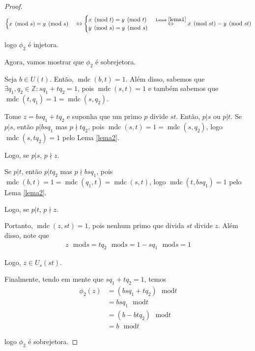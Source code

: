 \documentclass[a4paper,portuguese,11pt,twoside, leqno]{book}
\DeclareMathOperator{\mdc}{mdc}
\theoremstyle{definition}
\begin{document}
\begin{proof}
\begin{align*}
\begin{cases}
		x\pmod s = y\pmod s
		\end{cases}\Leftrightarrow
		\begin{cases}
		x\pmod t = y\pmod t \\
		y\pmod s = y\pmod s
		\end{cases} \overset{\text{Lema } \eqref{lema1}}{\Leftrightarrow } x\pmod {st} = y\pmod{st} 
		\end{align*}
		\par\vspace{0.3cm}logo $\phi_2$ é injetora. 
		\par\vspace{0.3cm} Agora, vamos mostrar que $\phi_2$ é sobrejetora.
		\par\vspace{0.3cm} Seja $b\in U(t)$. Então, $\mdc(b,t) = 1$. Além disso, sabemos que $\exists q_1, q_2\in\mathbb{Z}: sq_1 + tq_2 = 1$, pois $\mdc(s,t) = 1$ e também sabemos que $\mdc(t,q_1) = 1 = \mdc(s, q_2)$. 
		\par\vspace{0.3cm} Tome $z = bsq_1 + tq_2$ e suponha que um primo $p$ divide $st$. Então, $p|s$ ou $p|t$. Se $p|s$, então $p|bsq_1$ mas $p\nmid tq_2$, pois $\mdc(s,t) = 1 = \mdc(s,q_2)$, logo $\mdc(s, tq_2) = 1$ pelo Lema \eqref{lema2}. 
		\par\vspace{0.3cm} Logo, se $p|s$, $p\nmid z$.
		\par\vspace{0.3cm} Se $p|t$, então $p|tq_2$ mas $p\nmid bsq_1$, pois $\mdc(b,t) = 1 = \mdc(q_1, t) = \mdc(s,t)$, logo $\mdc(t, bsq_1) = 1$ pelo Lema \eqref{lema2}.
		\par\vspace{0.3cm} Logo, se $p|t$, $p\nmid z$.
		\par\vspace{0.3cm} Portanto, $\mdc(z, st) = 1$, pois nenhum primo que divida $st$ divide $z$. Além disso, note que 
		\begin{align*}
		z\text{ }\mathrm{mod} s = tq_2\text{ }\mathrm{mod} s = 1 - sq_1 \text{ }\mathrm{mod} s = 1
		\end{align*} 
		\par\vspace{0.3cm} Logo, $z\in U_s(st)$. 
		\par\vspace{0.3cm} Finalmente, tendo em mente que $sq_1 + tq_2 = 1$, temos
		\begin{align*}
		\phi_2(z) &= (bsq_1 + tq_2)\text{ }\mathrm{mod} t \\ &= bsq_1\text{ }\mathrm{mod} t \\ &= (b - btq_2)\text{ }\mathrm{mod} t \\ &= b\text{ }\mathrm{mod} t
		\end{align*}
		\par\vspace{0.3cm}logo $\phi_2$ é sobrejetora.
		

\end{proof}
\end{document}
